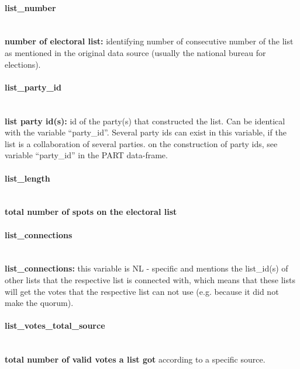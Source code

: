 \documentclass{article}
\begin{document}

\paragraph{list\_number}\\
        \textbf{number of electoral list:}  identifying number of consecutive number of the list as mentioned in the original data source (usually the national bureau for elections).

\paragraph{list\_party\_id}\\
          \textbf{list party id(s):} id of the party(s) that constructed the list. Can be identical with the variable ``party\_id''. Several party ids can exist in this variable, if the list is a collaboration of several parties. on the construction of party ids, see variable ``party\_id'' in the PART data-frame.

\paragraph{list\_length}\\
    \textbf{total number of spots on the electoral list}

\paragraph{list\_connections}\\
 \textbf{list\_connections:} this variable is NL - specific and mentions the list\_id(s) of other lists that the respective list is connected with, which means that these lists will get the votes that the respective list can not use (e.g. because it did not make the quorum).
 
\paragraph{list\_votes\_total\_source}\\
   \textbf {total number of valid votes a list got} according to a specific source.
   
\end{document}

